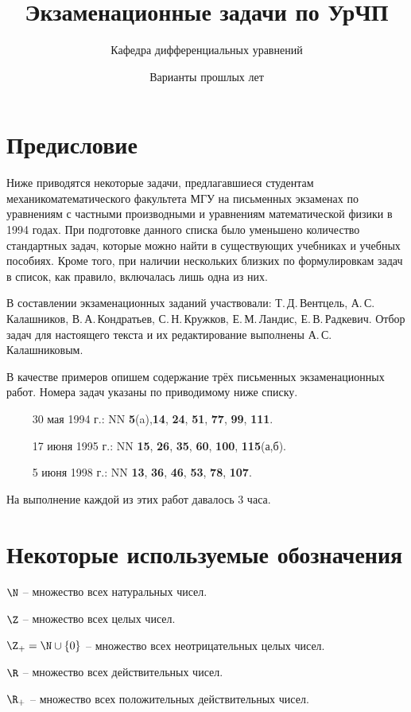 \documentclass[a4paper]{article}
\title{Экзаменационные задачи по УрЧП}
\author{Кафедра дифференциальных уравнений}
\date{Варианты прошлых лет}
\begin{document}
\maketitle

\section*{Предисловие}

Ниже приводятся некоторые задачи, предлагавшиеся студентам механико\д математического факультета МГУ на
письменных экзаменах по уравнениям с частными производными и уравнениям математической физики в
1994 годах. При подготовке данного списка было уменьшено количество стандартных задач, которые
можно найти в существующих учебниках и учебных пособиях. Кроме того, при наличии нескольких близких по
формулировкам задач в список, как правило, включалась лишь одна из них.

В составлении экзаменационных заданий участвовали:
Т.\,Д.\,Вентцель, А.\,С.\,Калашников, В.\,А.\,Кондратьев, С.\,Н.\,Кружков, Е.\,М.\,Ландис,
Е.\,В.\,Радкевич. Отбор задач для настоящего текста и их редактирование
выполнены А.\,С.\,Калашниковым.

В качестве примеров опишем содержание трёх письменных экзаменационных
работ. Номера задач указаны по приводимому ниже списку.

$\qquad$ 30 мая 1994 г.: NN {\bf 5}(a),{\bf 14}, {\bf 24}, {\bf 51},
{\bf 77}, {\bf 99}, {\bf 111}.

$\qquad$ 17 июня 1995 г.: NN {\bf 15}, {\bf 26}, {\bf 35}, {\bf 60},
{\bf 100}, {\bf 115}(а,б).

$\qquad$ 5 июня 1998 г.: NN {\bf 13}, {\bf 36}, {\bf 46}, {\bf 53}, {\bf 78},
{\bf 107}.

\noindent
На выполнение каждой из этих работ давалось 3 часа.

\section*{Некоторые используемые обозначения}

$\N$ -- множество всех натуральных чисел.

\noindent
$\Z$ -- множество всех целых чисел.

\noindent
$\Z_+=\N\cup\{0\}$ -- множество всех неотрицательных целых чисел.

\noindent
$\R$ -- множество всех действительных чисел.

\noindent
$\R_+$ -- множество всех положительных действительных чисел.
\end{document}
